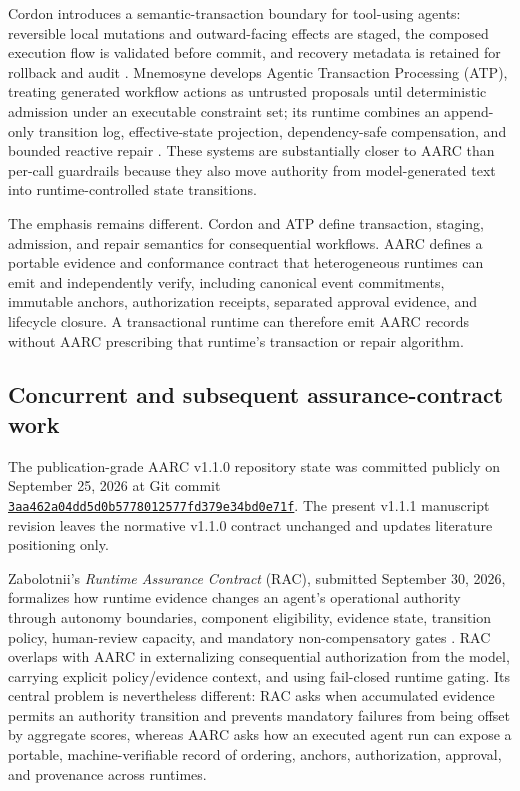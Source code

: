 \documentclass{article}
\begin{document}
Cordon introduces a semantic-transaction boundary for tool-using agents:
reversible local mutations and outward-facing effects are staged, the composed
execution flow is validated before commit, and recovery metadata is retained for
rollback and audit \cite{chen2026cordon}. Mnemosyne develops Agentic Transaction
Processing (ATP), treating generated workflow actions as untrusted proposals
until deterministic admission under an executable constraint set; its runtime
combines an append-only transition log, effective-state projection,
dependency-safe compensation, and bounded reactive repair
\cite{chang2026mnemosyne}. These systems are substantially closer to AARC than
per-call guardrails because they also move authority from model-generated text
into runtime-controlled state transitions.

The emphasis remains different. Cordon and ATP define transaction, staging,
admission, and repair semantics for consequential workflows. AARC defines a
portable evidence and conformance contract that heterogeneous runtimes can emit
and independently verify, including canonical event commitments, immutable
anchors, authorization receipts, separated approval evidence, and lifecycle
closure. A transactional runtime can therefore emit AARC records without AARC
prescribing that runtime's transaction or repair algorithm.

\subsection{Concurrent and subsequent assurance-contract work}

The publication-grade AARC v1.1.0 repository state was committed publicly on
September 25, 2026 at Git commit
\href{https://github.com/SaridakisStamatisChristos/Agentic-Audit-Reliability-Contract-AARC-/commit/3aa462a04dd5d0b5778012577fd379e34bd0e71f}
{\texttt{3aa462a04dd5d0b5778012577fd379e34bd0e71f}}.
The present v1.1.1 manuscript revision leaves the normative v1.1.0 contract
unchanged and updates literature positioning only.

Zabolotnii's \emph{Runtime Assurance Contract} (RAC), submitted September 30,
2026, formalizes how runtime evidence changes an agent's operational authority
through autonomy boundaries, component eligibility, evidence state, transition
policy, human-review capacity, and mandatory non-compensatory gates
\cite{zabolotnii2026rac}. RAC overlaps with AARC in externalizing consequential
authorization from the model, carrying explicit policy/evidence context, and
using fail-closed runtime gating. Its central problem is nevertheless different:
RAC asks when accumulated evidence permits an authority transition and prevents
mandatory failures from being offset by aggregate scores, whereas AARC asks how
an executed agent run can expose a portable, machine-verifiable record of
ordering, anchors, authorization, approval, and provenance across runtimes.
\end{document}
